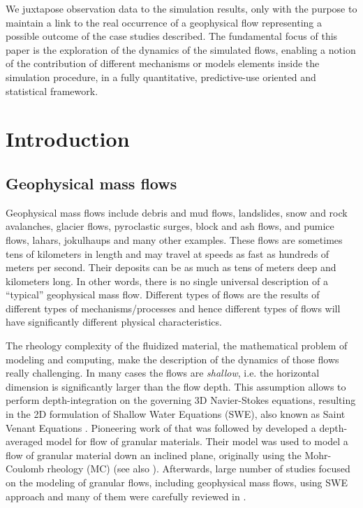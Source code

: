 \documentclass{article}
\begin{document}
We juxtapose observation data to the simulation results, only with the purpose to maintain a link to the real occurrence of a geophysical flow representing a possible outcome of the case studies described. The fundamental focus of this paper is the exploration of the dynamics of the simulated flows, enabling a notion of the contribution of different mechanisms or models elements inside the simulation procedure, in a fully quantitative, predictive-use oriented and statistical framework.

\newpage
\section{Introduction}\label{sec:Intro}

\subsection{Geophysical mass flows}\label{subsec:FlowTypes}
Geophysical mass flows include debris and mud flows, landslides, snow and rock avalanches, glacier flows, pyroclastic surges, block and ash flows, and pumice flows, lahars, jokulhaups and many other examples. These flows are sometimes tens of kilometers in length and may travel at speeds as fast as hundreds of meters per second. Their deposits can be as much as tens of meters deep and kilometers long. In other words, there is no single universal description of a ``typical'' geophysical mass flow. Different types of flows are the results of different types of mechanisms/processes and hence different types of flows will have significantly different physical characteristics.

The rheology complexity of the fluidized material, the mathematical problem of modeling and computing, make the description of the dynamics of those flows really challenging. In many cases the flows are \emph{shallow}, i.e. the horizontal dimension is significantly larger than the flow depth. This assumption allows to perform depth-integration on the governing 3D Navier-Stokes equations, resulting in the 2D formulation of Shallow Water Equations (SWE), also known as Saint Venant Equations \citep{Batchelor2000, Luca2016}. Pioneering work of \cite{SavageHutter1989} that was followed by \cite{Hutter1993,DadeHuppert1998} developed a depth-averaged model for flow of granular materials. Their model was used to model a flow of granular material down an inclined plane, originally using the Mohr-Coulomb rheology (MC) (see also \cite{Jaeger1989,FraccarolloToro1995}). Afterwards, large number of studies focused on the modeling of granular flows, including geophysical mass flows, using SWE approach and many of them were carefully reviewed in \cite{PudasainiHutter2007}.
\end{document}
